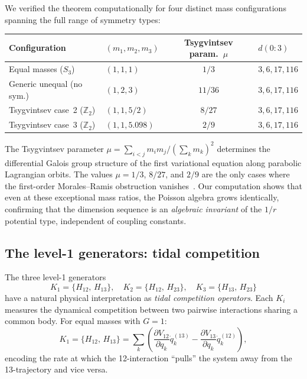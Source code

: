 \documentclass[11pt,a4paper]{article}
\theoremstyle{remark}
\newcommand{\pb}[2]{\{#1,\,#2\}}
\begin{document}
We verified the theorem computationally for four distinct mass
configurations spanning the full range of symmetry types:
\begin{center}
\begin{tabular}{@{}llcl@{}}
\toprule
Configuration & $(m_1, m_2, m_3)$ & Tsygvintsev param.\ $\mu$ & $d(0{:}3)$ \\
\midrule
Equal masses ($S_3$) & $(1,1,1)$ & $1/3$ & $3,6,17,116$ \\
Generic unequal (no sym.) & $(1,2,3)$ & $11/36$ & $3,6,17,116$ \\
Tsygvintsev case~2 ($\mathbb{Z}_2$) & $(1,1,5/2)$ & $8/27$ & $3,6,17,116$ \\
Tsygvintsev case~3 ($\mathbb{Z}_2$) & $(1,1,5.098)$ & $2/9$ & $3,6,17,116$ \\
\bottomrule
\end{tabular}
\end{center}

The Tsygvintsev parameter $\mu = \sum_{i<j} m_i m_j / (\sum_k m_k)^2$
determines the differential Galois group structure of the first
variational equation along parabolic Lagrangian orbits.  The
values $\mu = 1/3$, $8/27$, and $2/9$ are the only cases where
the first-order Morales--Ramis obstruction
vanishes~\cite{tsygvintsev-2007}.  Our computation shows that
even at these exceptional mass ratios, the Poisson algebra grows
identically, confirming that the dimension sequence is an
\emph{algebraic invariant} of the $1/r$ potential type, independent
of coupling constants.

\subsection{The level-1 generators: tidal competition}

The three level-1 generators
\[
  K_1 = \pb{H_{12}}{H_{13}}, \quad
  K_2 = \pb{H_{12}}{H_{23}}, \quad
  K_3 = \pb{H_{13}}{H_{23}}
\]
have a natural physical interpretation as \emph{tidal competition
operators}.  Each $K_i$ measures the dynamical competition between
two pairwise interactions sharing a common body.  For equal masses
with $G=1$:
\[
  K_1 = \pb{H_{12}}{H_{13}}
  = \sum_{k} \left(
    \frac{\partial V_{12}}{\partial q_k}\dot{q}_k^{(13)}
    - \frac{\partial V_{13}}{\partial q_k}\dot{q}_k^{(12)}
  \right),
\]
encoding the rate at which the 12-interaction ``pulls'' the system
away from the 13-trajectory and vice versa.


\end{document}
